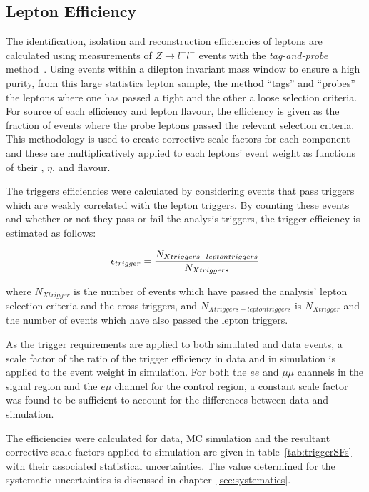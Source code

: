 \subsection{Lepton Efficiency}\label{subsec:leptonRecoSFs}
The identification, isolation and reconstruction efficiencies of leptons are calculated using measurements of $Z \rightarrow l^{+} l ^{-}$ events with the \emph{tag-and-probe} method~\cite{CMS:2008rxa}.
Using events within a dilepton invariant mass window to ensure a high purity, from this large statistics lepton sample, the method ``tags'' and ``probes'' the leptons where one has passed a tight and the other a loose selection criteria.
For source of each efficiency and lepton flavour, the efficiency is given as the fraction of events where the probe leptons passed the relevant selection criteria.
This methodology is used to create corrective scale factors for each component and these are multiplicatively applied to each leptons' event weight as functions of their \pt, $\eta$, and flavour.

The triggers efficiencies were calculated by considering events that pass triggers which are weakly correlated with the lepton triggers.
By counting these events and whether or not they pass or fail the analysis triggers, the trigger efficiency is estimated as follows:

\begin{equation}
\epsilon_{trigger} = \frac{N_{X triggers + lepton triggers}}{N_{X triggers}} \\
\end{equation}

where $N_{X trigger}$ is the number of events which have passed the analysis' lepton selection criteria and the cross triggers, and $N_{X triggers + lepton triggers}$ is $N_{X trigger}$ and the number of events which have also passed the lepton triggers.

As the trigger requirements are applied to both simulated and data events, a scale factor of the ratio of the trigger efficiency in data and in simulation is applied to the event weight in simulation.
For both the $ee$ and $\mu\mu$ channels in the signal region and the $e \mu$ channel for the \ttbar control region, a constant scale factor was found to be sufficient to account for the differences between data and simulation.

The efficiencies were calculated for data, \ttbar MC simulation and the resultant corrective scale factors applied to simulation are given in table~\ref{tab:triggerSFs} with their associated statistical uncertainties.
The value determined for the systematic uncertainties is discussed in chapter~\ref{sec:systematics}.

